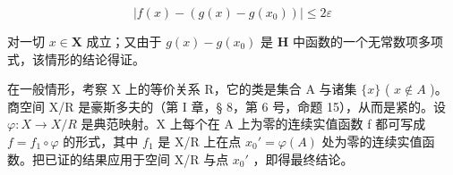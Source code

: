 \[
\left| f (x) - \left(g (x) - g \left(x _ {0}\right)\right) \right| \leqslant 2 \varepsilon
\]

对一切 \(x \in \mathbf{X}\) 成立；又由于 \(g(x) - g(x_0)\) 是 \(\mathbf{H}\) 中函数的一个无常数项多项式，该情形的结论得证。

在一般情形，考察 X 上的等价关系 R，它的类是集合 A 与诸集 \(\{x\}\) ( \(x \notin A\) )。商空间 X/R 是豪斯多夫的（第 I 章，§ 8，第 6 号，命题 15），从而是紧的。设 \(\varphi: X \to X/R\) 是典范映射。X 上每个在 A 上为零的连续实值函数 f 都可写成 \(f = f_{1} \circ \varphi\) 的形式，其中 \(f_{1}\) 是 X/R 上在点 \(x_{0}' = \varphi(A)\) 处为零的连续实值函数。把已证的结果应用于空间 X/R 与点 \(x_{0}'\) ，即得最终结论。

